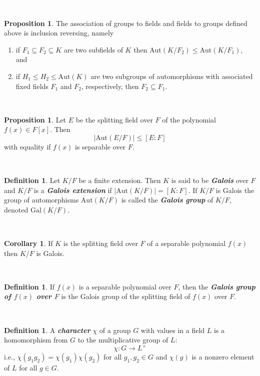 \documentclass{article}
\theoremstyle{definition}
\newtheorem{prop}[thm]{Proposition}
\newtheorem{cor}[thm]{Corollary}
\newtheorem{defn}[thm]{Definition}
\newcommand{\nl}{\textcolor{white}{nothing}}
\newcommand{\ra}{\rightarrow}
\newcommand{\seq}{\subseteq}
\newcommand{\Aut}{\text{Aut}}
\newcommand{\Gal}{\text{Gal}}
\begin{document}
\nl

\begin{prop}
The association of groups to fields and fields to groups defined above is inclusion reversing, namely
\begin{enumerate}
\item if $F_1\seq F_2\seq K$ are two subfields of $K$ then $\Aut(K/F_2)\leq \Aut(K/F_1)$, and
\item if $H_1\leq H_2\leq \Aut(K)$ are two subgroups of automorphisms with associated fixed fields $F_1$ and $F_2$, respectively, then $F_2\seq F_1$.
\end{enumerate}
\end{prop}

\nl

\begin{prop}
Let $E$ be the splitting field over $F$ of the polynomial $f(x)\in F[x]$. Then 
\[|\Aut(E/F)|\leq [E:F]\]
with equality if $f(x)$ is separable over $F$.
\end{prop}

\nl

\begin{defn}
Let $K/F$ be a finite extension. Then $K$ is said to be \textit{\textbf{Galois}} over $F$ and $K/F$ is a \textit{\textbf{Galois extension}} if $|\Aut(K/F)| = [K:F]$. If $K/F$ is Galois the group of automorphisms $\Aut(K/F)$ is called the \textit{\textbf{Galois group}} of $K/F$, denoted $\Gal(K/F)$.
\end{defn}

\nl

\begin{cor}
If $K$ is the splitting field over $F$ of a separable polynomial $f(x)$ then $K/F$ is Galois.
\end{cor}

\nl

\begin{defn}
If $f(x)$ is a separable polynomial over $F$, then the \textit{\textbf{Galois group of $f(x)$ over $F$}} is the Galois group of the splitting field of $f(x)$ over $F$.
\end{defn}

\nl

\begin{defn}
A \textit{\textbf{character}} $\chi$ of a group $G$ with values in a field $L$ is a homomorphism from $G$ to the multiplicative group of $L$:
\[\chi: G\ra L^\times\]
i.e., $\chi(g_1g_2) = \chi(g_1)\chi(g_2)$ for all $g_1,g_2\in G$ and $\chi(g)$ is a nonzero element of $L$ for all $g\in G$.
\end{defn}
\end{document}
